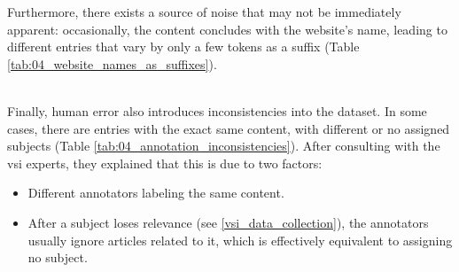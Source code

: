 




Furthermore, there exists a source of noise that may not be immediately apparent: occasionally, the content concludes with the website's name, leading to different entries that vary by only a few tokens as a suffix (Table \ref{tab:04_website_names_as_suffixes}).




\label{vsi_issues_annotation_inconsistencies}
\ \\

Finally, human error also introduces inconsistencies into the \VSI{} dataset. In some cases, there are entries with the exact same content, with different or no assigned subjects (Table \ref{tab:04_annotation_inconsistencies}). After consulting with the \gls{vsi} experts, they explained that this is due to two factors:

\begin{itemize}
    \item Different annotators labeling the same content.
    \item After a subject loses relevance (see \headerName{} \ref{vsi_data_collection}), the annotators usually ignore articles related to it, which is effectively equivalent to assigning no subject.
\end{itemize}








\clearpage